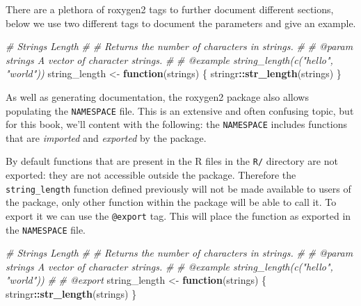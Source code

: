 \documentclass[
  10pt,
]{krantz}
\makeatletter
\newenvironment{Shaded}{\begin{snugshade}}{\end{snugshade}}
\newcommand{\CommentTok}[1]{\textcolor[rgb]{0.37,0.37,0.37}{\textit{#1}}}
\newcommand{\ControlFlowTok}[1]{\textcolor[rgb]{0.27,0.27,0.27}{\textbf{#1}}}
\newcommand{\KeywordTok}[1]{\textcolor[rgb]{0.27,0.27,0.27}{\textbf{#1}}}
\newcommand{\NormalTok}[1]{#1}
\newcommand{\OperatorTok}[1]{\textcolor[rgb]{0.43,0.43,0.43}{\textbf{#1}}}
\newcommand{\StringTok}[1]{\textcolor[rgb]{0.5,0.5,0.5}{#1}}
\newenvironment{kframe}{%
\medskip{}
\setlength{\fboxsep}{.8em}
 \def\at@end@of@kframe{}%
 \ifinner\ifhmode%
  \def\at@end@of@kframe{\end{minipage}}%
  \begin{minipage}{\columnwidth}%
 \fi\fi%
 \def\FrameCommand##1{\hskip\@totalleftmargin \hskip-\fboxsep
 \colorbox{shadecolor}{##1}\hskip-\fboxsep
     \hskip-\linewidth \hskip-\@totalleftmargin \hskip\columnwidth}%
 \MakeFramed {\advance\hsize-\width
   \@totalleftmargin\z@ \linewidth\hsize
   \@setminipage}}%
 {\par\unskip\endMakeFramed%
 \at@end@of@kframe}
\renewenvironment{Shaded}{\begin{kframe}}{\end{kframe}}
\makeatother
\begin{document}
There are a plethora of roxygen2 tags to further document different sections, below we use two different tags to document the parameters and give an example.

\begin{Shaded}
\begin{Highlighting}[]
\CommentTok{\#\textquotesingle{} Strings Length}
\CommentTok{\#\textquotesingle{} }
\CommentTok{\#\textquotesingle{} Returns the number of characters in strings. }
\CommentTok{\#\textquotesingle{} }
\CommentTok{\#\textquotesingle{} @param strings A vector of character strings.}
\CommentTok{\#\textquotesingle{} }
\CommentTok{\#\textquotesingle{} @example string\_length(c("hello", "world"))}
\NormalTok{string\_length <{-}}\StringTok{ }\ControlFlowTok{function}\NormalTok{(strings) \{}
\NormalTok{  stringr}\OperatorTok{::}\KeywordTok{str\_length}\NormalTok{(strings)}
\NormalTok{\}}
\end{Highlighting}
\end{Shaded}

As well as generating documentation, the roxygen2 package also allows populating the \texttt{NAMESPACE} file. This is an extensive and often confusing topic, but for this book, we'll content with the following: the \texttt{NAMESPACE} includes functions that are \emph{imported} and \emph{exported} by the package.

By default functions that are present in the R files in the \texttt{R/} directory are not exported: they are not accessible outside the package. Therefore the \texttt{string\_length} function defined previously will not be made available to users of the package, only other function within the package will be able to call it. To export it we can use the \texttt{@export} tag. This will place the function as exported in the \texttt{NAMESPACE} file.

\begin{Shaded}
\begin{Highlighting}[]
\CommentTok{\#\textquotesingle{} Strings Length}
\CommentTok{\#\textquotesingle{} }
\CommentTok{\#\textquotesingle{} Returns the number of characters in strings. }
\CommentTok{\#\textquotesingle{} }
\CommentTok{\#\textquotesingle{} @param strings A vector of character strings.}
\CommentTok{\#\textquotesingle{} }
\CommentTok{\#\textquotesingle{} @example string\_length(c("hello", "world"))}
\CommentTok{\#\textquotesingle{} }
\CommentTok{\#\textquotesingle{} @export}
\NormalTok{string\_length <{-}}\StringTok{ }\ControlFlowTok{function}\NormalTok{(strings) \{}
\NormalTok{  stringr}\OperatorTok{::}\KeywordTok{str\_length}\NormalTok{(strings)}
\NormalTok{\}}
\end{Highlighting}
\end{Shaded}
\end{document}
